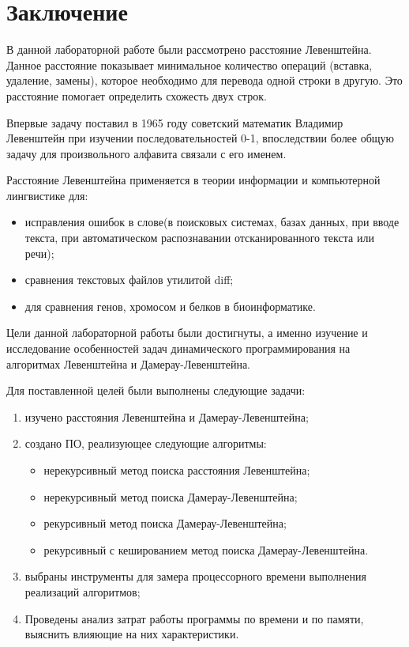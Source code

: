 \chapter*{Заключение}
В данной лабораторной работе были рассмотрено расстояние Левенштейна. Данное расстояние показывает минимальное количество операций (вставка, удаление, замены), которое необходимо для перевода одной строки в другую. Это расстояние помогает определить схожесть двух строк.

Впервые задачу поставил в 1965 году советский математик Владимир Левенштейн при изучении последовательностей 0-1, впоследствии более общую задачу для произвольного алфавита связали с его именем.

Расстояние Левенштейна применяется в теории информации и компьютерной лингвистике для:
\begin{itemize}
	\item исправления ошибок в слове(в поисковых системах, базах данных, при вводе текста, при автоматическом распознавании отсканированного текста или речи);
	\item сравнения текстовых файлов утилитой diff;
	\item для сравнения генов, хромосом и белков в биоинформатике.
\end{itemize}

Цели данной лабораторной работы были достигнуты, а именно изучение и исследование особенностей задач динамического программирования на алгоритмах Левенштейна и Дамерау-Левенштейна.

Для поставленной целей были выполнены следующие задачи:
\begin{enumerate}[label={\arabic*)}]
	\item изучено расстояния Левенштейна и Дамерау-Левенштейна;
	\item создано ПО, реализующее следующие алгоритмы:
	\begin{itemize}
		\item нерекурсивный метод поиска расстояния Левенштейна;
		\item нерекурсивный метод поиска Дамерау-Левенштейна;
		\item рекурсивный метод поиска Дамерау-Левенштейна;
		\item  рекурсивный с кешированием метод поиска Дамерау-Левенштейна.
	\end{itemize}
	\item выбраны инструменты для замера процессорного времени выполнения реализаций алгоритмов;
	\item Проведены анализ затрат работы программы по времени и по памяти, выяснить влияющие на них характеристики.
\end{enumerate}